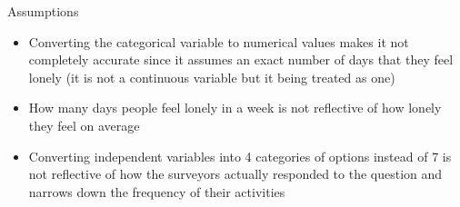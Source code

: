 \documentclass{beamer}
\begin{document}
\begin{frame}{Assumptions}
\begin{itemize}
    \item Converting the categorical variable to numerical values makes it not completely accurate since it assumes an exact number of days that they feel lonely (it is not a continuous variable but it being treated as one)\\
    \item How many days people feel lonely in a week is not reflective of how lonely they feel on average\\
    \item Converting independent variables into 4 categories of options instead of 7 is not reflective of how the surveyors actually responded to the question and narrows down the frequency of their activities
\end{itemize}
\end{frame}
\end{document}
